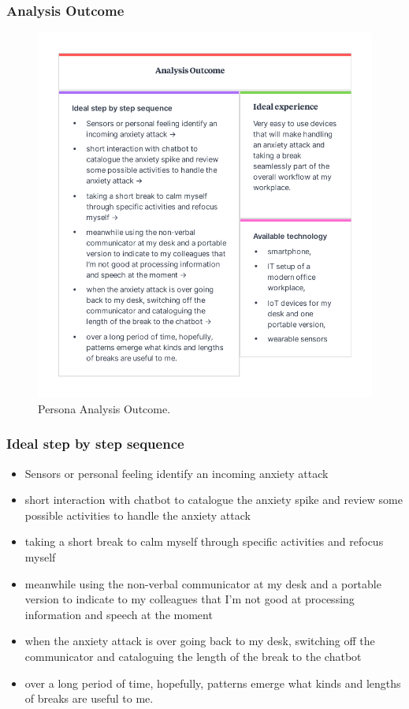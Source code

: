 \subsubsection{Analysis Outcome}\label{Persona Analysis Outcome}
\begin{figure}[hbt!] 
  \centering
  \includegraphics[width=1.04\linewidth]{chap3/image/persona_jans2.pdf}
  \caption[Persona Analysis outcome ]{Persona Analysis Outcome.}
  \label{fig:Persona_Analysis2}
\end{figure}
\subsubsection*{Ideal step by step sequence}
\begin{itemize}
    \item Sensors or personal feeling identify an incoming anxiety attack 
    \item short interaction with chatbot to catalogue the anxiety spike and review some possible activities to handle the anxiety attack 
    \item taking a short break to calm myself through specific activities and refocus myself 
    \item meanwhile using the non-verbal communicator at my desk and a portable version to indicate to my colleagues that I’m not good at processing information and speech at the moment 
    \item when the anxiety attack is over going back to my desk, switching off the communicator and cataloguing the length of the break to the chatbot 
    \item over a long period of time, hopefully, patterns emerge what kinds and lengths of breaks are useful to me.
\end{itemize}
